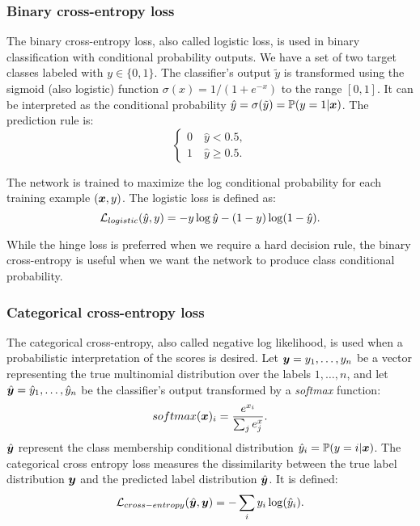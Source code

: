 \subsubsection{Binary cross-entropy loss}
The binary cross-entropy loss, also called logistic loss, is used in
binary classification with conditional probability outputs. We have a
set of two target classes labeled with $y\in\{0,1\}$. The classifier's
output $\tilde{y}$ is transformed using the sigmoid (also logistic)
function $\sigma(x)=1/(1+e^{-x})$ to the range $[0,1]$. It can be
interpreted as the conditional probability
$\hat{y}=\sigma(\tilde{y})=\mathbb{P}(y=1|\bm{x})$. The prediction rule is:
\begin{equation*}
  \begin{cases}
    0\quad\hat{y}<0.5,\\
    1\quad\hat{y}\geq 0.5.
  \end{cases}
\end{equation*}

The network is trained to maximize the log conditional probability for
each training example $(\bm{x},y)$. The logistic loss is defined as:
\begin{equation*}
  \mathcal{L}_{logistic}(\hat{y},y)=-y\log\hat{y}-(1-y)\log(1-\hat{y}).
\end{equation*}

While the hinge loss is preferred when we require a hard decision
rule, the binary cross-entropy is useful when we want the network to
produce class conditional probability.

\subsubsection{Categorical cross-entropy loss}
The categorical cross-entropy, also called negative log likelihood, is
used when a probabilistic interpretation of the scores is desired. Let
$\bm{y}=y_1,\dots,y_n$ be a vector representing the true multinomial
distribution over the labels $1,\dots,n$, and let
$\hat{\bm{y}}=\hat{y}_1,\dots,\hat{y}_n$ be the classifier's output
transformed by a \emph{softmax} function:
\begin{equation*}
  softmax(\bm{x})_i=\frac{e^{x_i}}{\sum_j e^x_j}.
\end{equation*}
$\hat{\bm{y}}$ represent the class membership conditional
distribution $\hat{y}_i=\mathbb{P}(y=i|\bm{x})$. The categorical cross
entropy loss measures the dissimilarity between the true label
distribution $\bm{y}$ and the predicted label distribution
$\hat{\bm{y}}$. It is defined:
\begin{equation*}
  \mathcal{L}_{cross-entropy}(\hat{\bm{y}},\bm{y})=-\sum_i y_i\log(\hat{y}_i).
\end{equation*}

